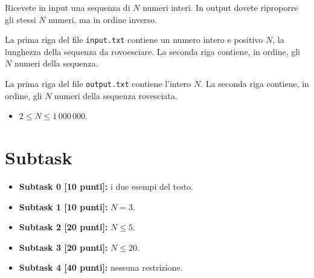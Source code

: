 \renewcommand{\nomebreve}{rovesciaseq}
\renewcommand{\titolo}{Rovesciare una sequenza}

\introduzione{}

Ricevete in input una sequenza di $N$ numeri interi.
In output dovete riproporre gli stessi $N$ numeri,
ma in ordine inverso.


La prima riga del file \verb'input.txt' contiene un numero intero e positivo $N$, la lunghezza della sequenza da rovoesciare.
La seconda riga contiene, in ordine, gli $N$ numeri della sequenza.

La prima riga del file \verb'output.txt' contiene l'intero $N$.
La seconda riga contiene, in ordine, gli $N$ numeri della sequenza rovesciata.



\begin{itemize}[nolistsep, noitemsep]
  \item $2 \le N \le 1\,000\,000$.
\end{itemize}
  
  \section*{Subtask}
  \begin{itemize}
    \item \textbf{Subtask 0 [10 punti]:} i due esempi del testo.
    \item \textbf{Subtask 1 [10 punti]:} $N = 3$.
    \item \textbf{Subtask 2 [20 punti]:} $N \leq 5$.
    \item \textbf{Subtask 3 [20 punti]:} $N \leq 20$.
    \item \textbf{Subtask 4 [40 punti]:} nessuna restrizione.
  \end{itemize}
  
